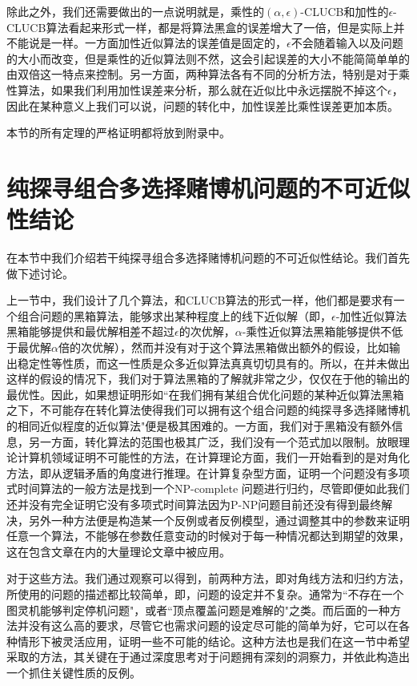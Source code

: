 \documentclass[bachelor]{thuthesis}
\begin{document}
除此之外，我们还需要做出的一点说明就是，乘性的$(\alpha,\epsilon)$-CLUCB和加性的$\epsilon$-CLUCB算法看起来形式一样，都是将算法黑盒的误差增大了一倍，但是实际上并不能说是一样。一方面加性近似算法的误差值是固定的，$\epsilon$不会随着输入以及问题的大小而改变，但是乘性的近似算法则不然，这会引起误差的大小不能简简单单的由双倍这一特点来控制。另一方面，两种算法各有不同的分析方法，特别是对于乘性算法，如果我们利用加性误差来分析，那么就在近似比中永远摆脱不掉这个$\epsilon$，因此在某种意义上我们可以说，问题的转化中，加性误差比乘性误差更加本质。

本节的所有定理的严格证明都将放到附录中。


\chapter{纯探寻组合多选择赌博机问题的不可近似性结论}
\label{cha:china}


在本节中我们介绍若干纯探寻组合多选择赌博机问题的不可近似性结论。我们首先做下述讨论。

上一节中，我们设计了几个算法，和CLUCB算法的形式一样，他们都是要求有一个组合问题的黑箱算法，能够求出某种程度上的线下近似解（即，$\epsilon$-加性近似算法黑箱能够提供和最优解相差不超过$\epsilon$的次优解，$\alpha$-乘性近似算法黑箱能够提供不低于最优解$\alpha$倍的次优解），然而并没有对于这个算法黑箱做出额外的假设，比如输出稳定性等性质，而这一性质是众多近似算法真真切切具有的。所以，在并未做出这样的假设的情况下，我们对于算法黑箱的了解就非常之少，仅仅在于他的输出的最优性。因此，如果想证明形如``在我们拥有某组合优化问题的某种近似算法黑箱之下，不可能存在转化算法使得我们可以拥有这个组合问题的纯探寻多选择赌博机的相同近似程度的近似算法"便是极其困难的。一方面，我们对于黑箱没有额外信息，另一方面，转化算法的范围也极其广泛，我们没有一个范式加以限制。放眼理论计算机领域证明不可能性的方法，在计算理论方面，我们一开始看到的是对角化方法，即从逻辑矛盾的角度进行推理。在计算复杂型方面，证明一个问题没有多项式时间算法的一般方法是找到一个NP-complete 问题进行归约，尽管即便如此我们还并没有完全证明它没有多项式时间算法因为P-NP问题目前还没有得到最终解决，另外一种方法便是构造某一个反例或者反例模型，通过调整其中的参数来证明任意一个算法，不能够在参数任意变动的时候对于每一种情况都达到期望的效果，这在包含文章\cite{lower}在内的大量理论文章中被应用。

对于这些方法。我们通过观察可以得到，前两种方法，即对角线方法和归约方法，所使用的问题的描述都比较简单，即，问题的设定并不复杂。通常为``不存在一个图灵机能够判定停机问题"，或者``顶点覆盖问题是难解的"之类。而后面的一种方法并没有这么高的要求，尽管它也需求问题的设定尽可能的简单为好，它可以在各种情形下被灵活应用，证明一些不可能的结论。这种方法也是我们在这一节中希望采取的方法，其关键在于通过深度思考对于问题拥有深刻的洞察力，并依此构造出一个抓住关键性质的反例。
\end{document}
